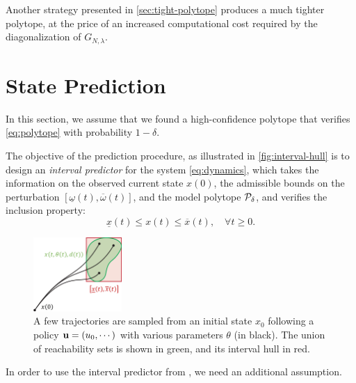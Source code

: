 \documentclass{article}
\begin{document}
Another strategy presented in \autoref{sec:tight-polytope} produces a much tighter polytope, at the price of an increased computational cost required by the diagonalization of $G_{N,\lambda}$.

\section{State Prediction}

In this section, we assume that we found a high-confidence polytope that verifies \eqref{eq:polytope} with probability $1-\delta$.

The objective of the prediction procedure, as illustrated in \autoref{fig:interval-hull} is to design an \emph{interval predictor} for the system \eqref{eq:dynamics}, which takes the information on the observed current state ${x}({0})$, the admissible bounds on the perturbation $[\underline{\omega}(t),\overline{\omega}(t)]$, and the model polytope $\mathcal{P}_\delta$, and verifies the inclusion property:
\begin{equation}
\label{eq:interval_property}
\underline{x}(t)\leq x(t)\leq\overline{x}(t),\quad\forall t\geq0.
\end{equation}

\begin{figure}
    \centering
    \includegraphics[width=0.3\textwidth]{img/interval-hull}
    \caption{A few trajectories are sampled from an initial state $x_0$ following a policy $\mathbf{u}=(u_0,\cdots)$ with various parameters $\theta$ (in black). The union of reachability sets is shown in green, and its interval hull in red.}
    \label{fig:interval-hull}
\end{figure}

In order to use the interval predictor from \citep{leurent2019interval}, we need an additional assumption.

\end{document}
